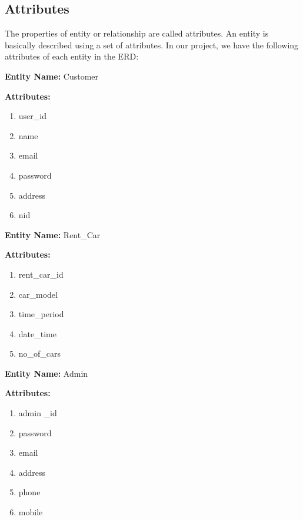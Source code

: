 \noindent 


\noindent 

\subsection{ Attributes}

\noindent The properties of entity or relationship are called attributes. An entity is basically described using a set of attributes. In our project, we have the following attributes of each entity in the ERD:

\noindent \textbf{Entity Name: } Customer

\noindent \textbf{Attributes:}

\begin{enumerate}
\item user\_id

\item  name

\item  email

\item  password

\item  address

\item  nid
\end{enumerate}

\noindent

\noindent \textbf{Entity Name: } Rent\_Car

\noindent \textbf{Attributes:}

\begin{enumerate}
\item rent\_car\_id

\item  car\_model

\item  time\_period

\item  date\_time

\item  no\_of\_cars

\end{enumerate}

\noindent

\noindent \textbf{Entity Name: } Admin

\noindent \textbf{Attributes:}

\begin{enumerate}
\item admin \_id

\item  password

\item  email

\item  address

\item  phone

\item  mobile

\end{enumerate}

